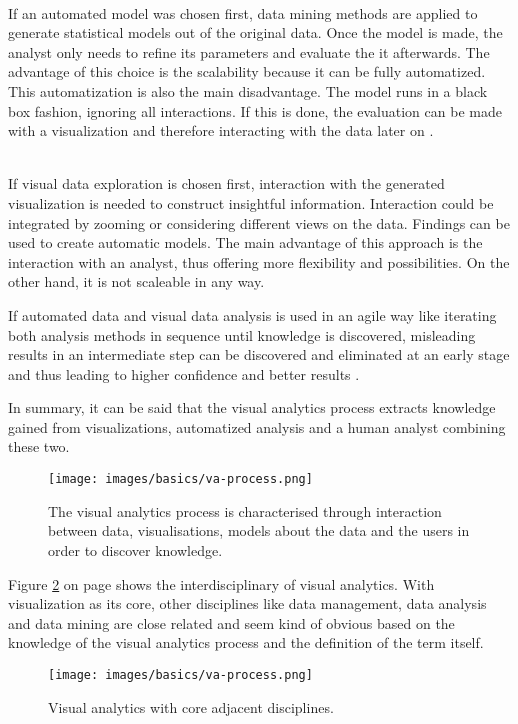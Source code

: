\begin{enumerate}
 \hfill \\
If an automated model was chosen first, data mining methods are applied to generate statistical models out of the original data. Once the model is made, the analyst only needs to refine its parameters and evaluate the it afterwards. The advantage of this choice is the scalability because it can be fully automatized. This automatization is also the main disadvantage. The model runs in a black box fashion, ignoring all interactions. If this is done, the evaluation can be made with a visualization and therefore interacting with the data later on .

 \hfill \\
If visual data exploration is chosen first, interaction with the generated visualization is needed to construct insightful information. Interaction could be integrated by zooming or considering different views on the data. Findings can be used to create automatic models. The main advantage of this approach is the interaction with an analyst, thus offering more flexibility and possibilities. On the other hand, it is not scaleable in any way.
\end{enumerate}

If automated data and visual data analysis is used in an agile way like iterating both analysis methods in sequence until knowledge is discovered, misleading results in an intermediate step can be discovered and eliminated at an early stage and thus leading to higher confidence and better results .

In summary, it can be said that the visual analytics process extracts knowledge gained from visualizations, automatized analysis and a human analyst combining these two.

\begin{figure}[!htb]
\centering
\texttt{[image: images/basics/va-process.png]}
\caption[
    The visual analytics process is characterised through interaction between data, visualisations, models about the data and the users in order to discover knowledge .
]{The visual analytics process is characterised through interaction between data, visualisations, models about the data and the users in order to discover knowledge.}
\label{fig:va-process}
\end{figure}

Figure \ref{fig:va-related} on page \pageref{fig:va-related} shows the interdisciplinary of visual analytics. With visualization as its core, other disciplines like data management, data analysis and data mining are close related and seem kind of obvious based on the knowledge of the visual analytics process and the definition of the term itself.

\begin{figure}[!htb]
\centering
\texttt{[image: images/basics/va-process.png]}
\caption[
    Visual analytics with core adjacent disciplines .
]{Visual analytics with core adjacent disciplines.}
\label{fig:va-related}
\end{figure}

